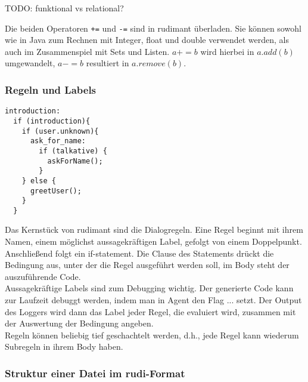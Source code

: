 TODO: funktional vs relational?

Die beiden Operatoren \texttt{+=} und \texttt{-=} sind in rudimant überladen. Sie können sowohl wie in Java zum Rechnen mit Integer, float und double verwendet werden, als auch im Zusammenspiel mit Sets und Listen. $ a += b $ wird hierbei in $ a.add(b) $ umgewandelt, $ a-= b $ resultiert in $ a.remove(b) $.

\subsubsection{Regeln und Labels}

\begin{verbatim}
introduction:
  if (introduction){
    if (user.unknown){
      ask_for_name:
        if (talkative) {
          askForName();
        }
    } else {
      greetUser();
    }
  }
\end{verbatim}

Das Kernstück von rudimant sind die Dialogregeln. Eine Regel beginnt mit ihrem Namen, einem möglichst aussagekräftigen Label, gefolgt von einem Doppelpunkt. Anschließend folgt ein if-statement. Die Clause des Statements drückt die Bedingung aus, unter der die Regel ausgeführt werden soll, im Body steht der auszuführende Code.\\
Aussagekräftige Labels sind zum Debugging wichtig. Der generierte Code kann zur Laufzeit debuggt werden, indem man in Agent den Flag ... setzt. Der Output des Loggers wird dann das Label jeder Regel, die evaluiert wird, zusammen mit der Auswertung der Bedingung angeben.\\
Regeln können beliebig tief geschachtelt werden, d.h., jede Regel kann wiederum Subregeln in ihrem Body haben.


\subsubsection{Struktur einer Datei im rudi-Format}

